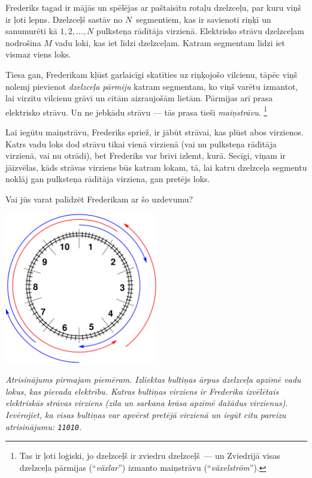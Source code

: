 \ifx\boi\undefined\fi
\def\version{jury-1}
Frederiks tagad ir mājās un spēlējas ar paštaisītu rotaļu dzelzceļu, par kuru viņš ir ļoti lepns.
Dzelzceļš sastāv no $N$~segmentiem, kas ir savienoti riņķī un sanumurēti kā $1, 2, \dots, N$ pulksteņa rādītāja virzienā.
Elektrisko strāvu dzelzceļam nodrošina $M$ vadu loki, kas iet līdzi dzelzceļam.
Katram segmentam līdzi iet vismaz viens loks.

Tiesa gan, Frederikam kļūst garlaicīgi skatīties uz riņķojošo vilcienu, tāpēc viņš nolemj pievienot \emph{dzelzceļa pārmiju}
katram segmentam, ko viņš varētu izmantot, lai virzītu vilcienu grāvī un citām aizraujošām lietām.
Pārmijas arī prasa elektrisko strāvu. Un ne jebkādu strāvu — tās prasa tieši \emph{maiņstrāvu}.%
\footnote{Tas ir ļoti loģiski, jo dzelzceļš ir zviedru dzelzceļš~--- un Zviedrijā visas dzelzceļa pārmijas
(``\emph{växlar}'') izmanto maiņstrāvu (``\emph{växelström}'').}

Lai iegūtu maiņstrāvu, Frederiks spriež, ir jābūt strāvai, kas plūst abos
virzienos. Katrs vadu loks dod strāvu tikai vienā virzienā (vai nu pulksteņa rādītāja virzienā,
vai nu otrādi), bet Frederiks var brīvi izlemt, kurā. Secīgi, viņam ir jāizvēlas,
kāds strāvas virziens būs katram lokam, tā, lai katru dzelzceļa segmentu noklāj gan pulksteņa
rādītāja virziena, gan pretējs loks.

Vai jūs varat palīdzēt Frederikam ar šo uzdevumu?

\vspace{2mm}
\begin{center}
\includegraphics[width=0.5\textwidth]{alternatingfig.pdf}
\end{center}
\vspace{1mm}
{\em Atrisinājums pirmajam piemēram. Izliektas bultiņas ārpus dzelzceļa apzīmē vadu lokus, kas pievada elektrību. Katras bultiņas virziens ir Frederika izvēlētais elektriskās strāvas virziens (zila un sarkana krāsa apzīmē dažādus virzienus). Ievērojiet, ka visas bultiņas var apvērst pretējā virzienā un iegūt citu pareizu atrisinājumu: \texttt{11010}.}

